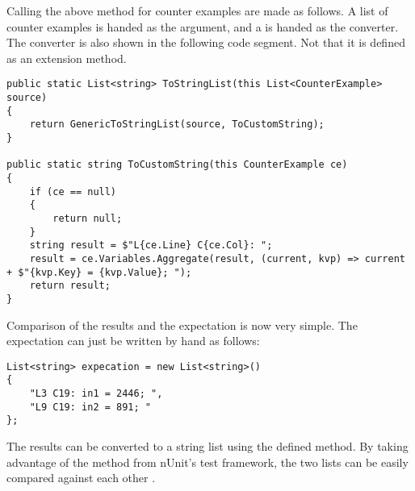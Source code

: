 Calling the above method for counter examples are made as follows. A list of counter examples is handed as the argument, and a  is handed as the converter. The converter is also shown in the following code segment. Not that it is defined as an extension method.

\begin{lstlisting}[caption={Converting CounterExamples to strings}, captionpos=b, label={lst:fileRef}]
public static List<string> ToStringList(this List<CounterExample> source)
{
    return GenericToStringList(source, ToCustomString);
}

public static string ToCustomString(this CounterExample ce)
{
    if (ce == null)
    {
        return null;
    }
    string result = $"L{ce.Line} C{ce.Col}: ";
    result = ce.Variables.Aggregate(result, (current, kvp) => current + $"{kvp.Key} = {kvp.Value}; ");
    return result;
}
\end{lstlisting}

Comparison of the results and the expectation is now very simple. The expectation can just be written by hand as follows:

\begin{lstlisting}[caption={Expectation}, captionpos=b, label={lst:testexpectation}]
List<string> expecation = new List<string>()
{
    "L3 C19: in1 = 2446; ",
    "L9 C19: in2 = 891; "
};
\end{lstlisting}

The results can be converted to a string list using the defined  method. By taking advantage of the method  from nUnit's test framework, the two lists can be easily compared against each other \cite{nunitCollectionAssert}.

